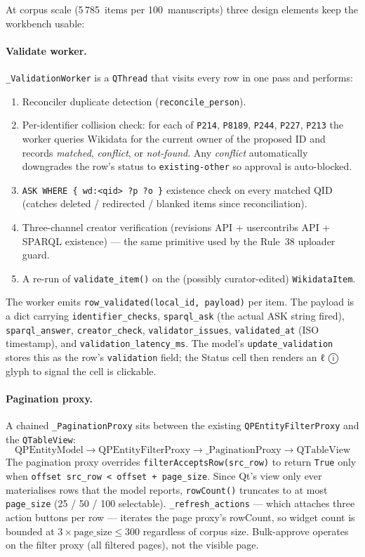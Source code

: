 \documentclass[12pt]{article}
\newcommand{\code}[1]{\texttt{#1}}
\begin{document}
At corpus scale (5\,785~items per 100~manuscripts) three design elements keep the workbench usable:

\paragraph{Validate worker.}
\code{\_ValidationWorker} is a \code{QThread} that visits every row in one pass and performs:
\begin{enumerate}
\item Reconciler duplicate detection (\code{reconcile\_person}).
\item Per-identifier collision check: for each of \code{P214}, \code{P8189}, \code{P244}, \code{P227}, \code{P213} the worker queries Wikidata for the current owner of the proposed ID and records \emph{matched}, \emph{conflict}, or \emph{not-found}. Any \emph{conflict} automatically downgrades the row's status to \code{existing-other} so approval is auto-blocked.
\item \code{ASK WHERE \{\ wd:<qid> ?p ?o\ \}} existence check on every matched QID (catches deleted / redirected / blanked items since reconciliation).
\item Three-channel creator verification (revisions API + usercontribs API + SPARQL existence) — the same primitive used by the Rule~38 uploader guard.
\item A re-run of \code{validate\_item()} on the (possibly curator-edited) \code{WikidataItem}.
\end{enumerate}

The worker emits \code{row\_validated(local\_id, payload)} per item. The payload is a dict carrying \code{identifier\_checks}, \code{sparql\_ask} (the actual ASK string fired), \code{sparql\_answer}, \code{creator\_check}, \code{validator\_issues}, \code{validated\_at} (ISO timestamp), and \code{validation\_latency\_ms}. The model's \code{update\_validation} stores this as the row's \code{validation} field; the Status cell then renders an ℓ ⓘ glyph to signal the cell is clickable.

\paragraph{Pagination proxy.}
A chained \code{\_PaginationProxy} sits between the existing \code{QPEntityFilterProxy} and the \code{QTableView}:
\[
\text{QPEntityModel} \to \text{QPEntityFilterProxy} \to \text{\_PaginationProxy} \to \text{QTableView}
\]
The pagination proxy overrides \code{filterAcceptsRow(src\_row)} to return \code{True} only when \code{offset \leq src\_row < offset + page\_size}. Since Qt's view only ever materialises rows that the model reports, \code{rowCount()} truncates to at most \code{page\_size} (25 / 50 / 100 selectable). \code{\_refresh\_actions} — which attaches three action buttons per row — iterates the page proxy's rowCount, so widget count is bounded at $3 \times \text{page\_size} \le 300$ regardless of corpus size. Bulk-approve operates on the filter proxy (all filtered pages), not the visible page.
\end{document}
